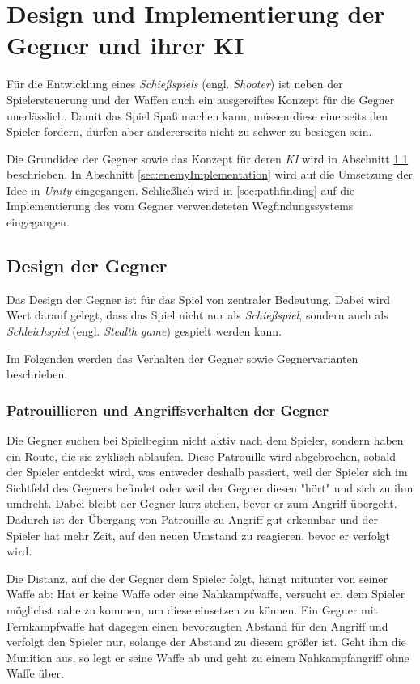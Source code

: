 \section{Design und Implementierung der Gegner und ihrer KI}\label{sec:enemiesAndAI}

Für die Entwicklung eines \textit{Schießspiels} (engl. \textit{Shooter}) ist neben der Spielersteuerung und der Waffen auch ein ausgereiftes Konzept für die Gegner unerlässlich. Damit das Spiel Spaß machen kann, müssen diese einerseits den Spieler fordern, dürfen aber andererseits nicht zu schwer zu besiegen sein.

Die Grundidee der Gegner sowie das Konzept für deren \textit{KI} wird in Abschnitt \ref{sec:enemyDesign} beschrieben. In Abschnitt \ref{sec:enemyImplementation} wird auf die Umsetzung der Idee in \textit{Unity} eingegangen. Schließlich wird in \ref{sec:pathfinding} auf die Implementierung des vom Gegner verwendeteten Wegfindungssystems eingegangen.

\subsection{Design der Gegner}
\label{sec:enemyDesign}

Das Design der Gegner ist für das Spiel von zentraler Bedeutung. Dabei wird Wert darauf gelegt, dass das Spiel nicht nur als \textit{Schießspiel}, sondern auch als \textit{Schleichspiel} (engl. \textit{Stealth game}) gespielt werden kann.

Im Folgenden werden das Verhalten der Gegner sowie Gegnervarianten beschrieben.

\subsubsection{Patrouillieren und Angriffsverhalten der Gegner}
\label{sec:enemyDesignAttack}

Die Gegner suchen bei Spielbeginn nicht aktiv nach dem Spieler, sondern haben ein Route, die sie zyklisch ablaufen. Diese Patrouille wird abgebrochen, sobald der Spieler entdeckt wird, was entweder deshalb passiert, weil der Spieler sich im Sichtfeld des Gegners befindet oder weil der Gegner diesen "hört" und sich zu ihm umdreht. Dabei bleibt der Gegner kurz stehen, bevor er zum Angriff übergeht. Dadurch ist der Übergang von Patrouille zu Angriff gut erkennbar und der Spieler hat mehr Zeit, auf den neuen Umstand zu reagieren, bevor er verfolgt wird.

Die Distanz, auf die der Gegner dem Spieler folgt, hängt mitunter von seiner Waffe ab: Hat er keine Waffe oder eine Nahkampfwaffe, versucht er, dem Spieler möglichst nahe zu kommen, um diese einsetzen zu können. Ein Gegner mit Fernkampfwaffe hat dagegen einen bevorzugten Abstand für den Angriff und verfolgt den Spieler nur, solange der Abstand zu diesem größer ist. Geht ihm die Munition aus, so legt er seine Waffe ab und geht zu einem Nahkampfangriff ohne Waffe über. 

